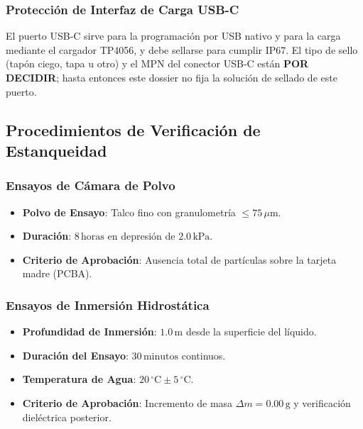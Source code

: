 \subsubsection{Protección de Interfaz de Carga USB-C}

El puerto USB-C sirve para la programación por USB nativo y para la carga mediante el cargador TP4056, y debe sellarse para cumplir IP67. El tipo de sello (tapón ciego, tapa u otro) y el MPN del conector USB-C están \textbf{POR DECIDIR}; hasta entonces este dossier no fija la solución de sellado de este puerto.

\subsection{Procedimientos de Verificación de Estanqueidad}

\subsubsection{Ensayos de Cámara de Polvo}

\begin{itemize}[leftmargin=*]
    \item \textbf{Polvo de Ensayo}: Talco fino con granulometría $\le 75\,\mu\text{m}$.
    \item \textbf{Duración}: $8\,\text{horas}$ en depresión de $2.0\,\text{kPa}$.
    \item \textbf{Criterio de Aprobación}: Ausencia total de partículas sobre la tarjeta madre (PCBA).
\end{itemize}

\subsubsection{Ensayos de Inmersión Hidrostática}

\begin{itemize}[leftmargin=*]
    \item \textbf{Profundidad de Inmersión}: $1.0\,\text{m}$ desde la superficie del líquido.
    \item \textbf{Duración del Ensayo}: $30\,\text{minutos}$ continuos.
    \item \textbf{Temperatura de Agua}: $20\,^\circ\text{C} \pm 5\,^\circ\text{C}$.
    \item \textbf{Criterio de Aprobación}: Incremento de masa $\Delta m = 0.00\,\text{g}$ y verificación dieléctrica posterior.
\end{itemize}

